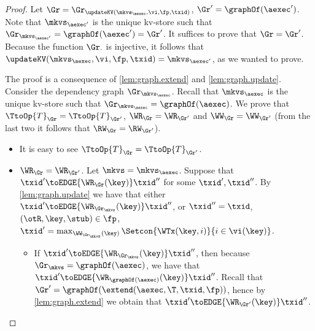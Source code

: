 \begin{proof}
Let $\Gr = \Gr_{\updateKV(\mkvs_{\aexec}, \vi, \fp, \txid)}$, $\Gr' = \graphOf(\aexec')$. 
Note that $\mkvs_{\aexec'}$ is the unique kv-store such that $\Gr_{\mkvs_{\aexec'}} = \graphOf(\aexec') = \Gr'$. 
It suffices to prove that $\Gr = \Gr'$. Because the function $\Gr_{\cdot}$ is injective, it follows that 
$\updateKV(\mkvs_{\aexec}, \vi, \fp, \txid) = \mkvs_{\aexec'}$, as we wanted to prove.  

The proof is a consequence of \cref{lem:graph.extend} and \cref{lem:graph.update}. 
Consider the dependency graph $\Gr_{\mkvs_{\aexec}}$.
Recall that $\mkvs_{\aexec}$ is the unique kv-store such that $\Gr_{\mkvs_{\aexec}} = \graphOf(\aexec)$. 
We prove that $\TtoOp{T}_{\Gr} = \TtoOp{T}_{\Gr'}$, $\WR_{\Gr} = \WR_{\Gr'}$ and 
$\WW_{\Gr} = \WW_{\Gr'}$ (from the last two it follows that $\RW_{\Gr} = \RW_{\Gr'}$). 
\begin{itemize}
\item It is easy to see $\TtoOp{T}_{\Gr} = \TtoOp{T}_{\Gr'}$.

\item $\WR_{\Gr} = \WR_{\Gr'}$.
Let \( \mkvs  = \mkvs_\aexec \).
Suppose that $\txid' \toEDGE{\WR_{\Gr}(\key)} \txid''$ for some $\txid', \txid''$. 
By \cref{lem:graph.update} we have that either $\txid' \toEDGE{\WR_{\Gr_\mkvs}(\key)} \txid''$, 
or $\txid'' = \txid$, $(\otR, \key, \stub) \in \fp$, $\txid' = \max_{\WW_{\Gr_\mkvs}(\key)}\Setcon{\WTx(\key, i) }{ i \in \vi(\key)}$. 

\begin{itemize}
\item If $\txid' \toEDGE{\WR_{\Gr_\mkvs}(\key)} \txid''$, then because 
$\Gr_\mkvs = \graphOf(\aexec)$, we have that $\txid' \toEDGE{\WR_{\graphOf(\aexec)}(\key)} \txid''$. 
Recall that $\Gr' = \graphOf(\extend(\aexec, \T, \txid, \fp))$, hence by \cref{lem:graph.extend} 
we obtain that $\txid' \toEDGE{\WR_{\Gr'}(\key)} \txid''$. 


\end{itemize}
\end{itemize}
\end{proof}

